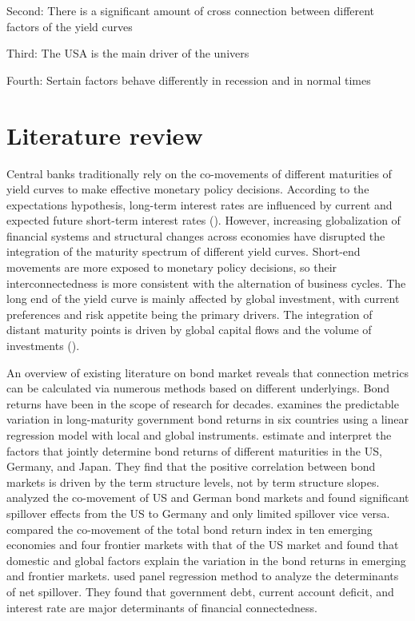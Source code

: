\documentclass[12pt,bibliography=totoc]{article}
\begin{document}
Second: There is a significant amount of cross connection between different factors of the yield curves

Third: The USA is the main driver of the univers

Fourth: Sertain factors behave differently in recession and in normal times

\newpage 

\section{Literature review}

Central banks traditionally rely on the co-movements of different maturities of yield curves to make effective monetary policy decisions. 
According to the expectations hypothesis, long-term interest rates are influenced by current and expected future short-term interest rates (\cite{laopodis2004monetary}). 
However, increasing globalization of financial systems and structural changes across economies have disrupted the integration of the maturity spectrum of different yield curves. 
Short-end movements are more exposed to monetary policy decisions, so their interconnectedness is more consistent with the alternation of business cycles. 
The long end of the yield curve is mainly affected by global investment, with current preferences and risk appetite being the primary drivers. 
The integration of distant maturity points is driven by global capital flows and the volume of investments (\cite{ilmanen1995time}).

An overview of existing literature on bond market reveals that connection metrics can be calculated via numerous methods based on different underlyings. 
Bond returns have been in the scope of research for decades. 
\cite{ilmanen1995time} examines the predictable variation in long-maturity government bond returns in six countries using a linear regression model with local and global instruments. 
\cite{driessen2003common} estimate and interpret the factors that jointly determine bond returns of different maturities in the US, Germany, and Japan. They find that the positive correlation between bond markets is driven by the term structure levels, not by term structure slopes.
\cite{engsted2007comovement} analyzed the co-movement of US and German bond markets and found significant spillover effects from the US to Germany and only limited spillover vice versa. 
\cite{piljak2013bond} compared the co-movement of the total bond return index in ten emerging economies and four frontier markets with that of the US market and found that domestic and global factors explain the variation in the bond returns in emerging and frontier markets.\cite{ahmad2018financial} used panel regression method to analyze the determinants of net spillover. They found that government debt, current account deficit, and interest rate are major determinants of financial connectedness.
\end{document}
